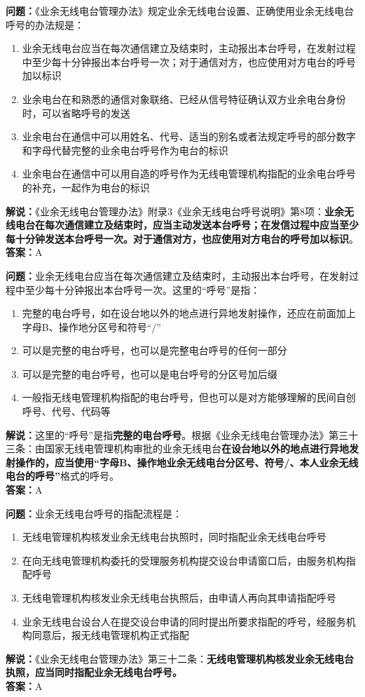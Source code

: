 \textbf{问题：}《业余无线电台管理办法》规定业余无线电台设置、正确使用业余无线电台呼号的办法规是：
\begin{enumerate}[label=\Alph*), leftmargin=1cm]
	\item 业余无线电台应当在每次通信建立及结束时，主动报出本台呼号，在发射过程中至少每十分钟报出本台呼号一次；对于通信对方，也应使用对方电台的呼号加以标识
	\item 业余电台在和熟悉的通信对象联络、已经从信号特征确认双方业余电台身份时，可以省略呼号的发送
	\item 业余电台在通信中可以用姓名、代号、适当的别名或者法规定呼号的部分数字和字母代替完整的业余电台呼号作为电台的标识
	\item 业余电台在通信中可以用自造的呼号作为无线电管理机构指配的业余电台呼号的补充，一起作为电台的标识
\end{enumerate}
\textbf{解说：}《业余无线电台管理办法》附录3《业余无线电台呼号说明》第8项：\textbf{业余无线电台在每次通信建立及结束时，应当主动发送本台呼号；在发信过程中应当至少每十分钟发送本台呼号一次。对于通信对方，也应使用对方电台的呼号加以标识}。\\\textbf{答案：}A

\textbf{问题：}业余无线电台应当在每次通信建立及结束时，主动报出本台呼号，在发射过程中至少每十分钟报出本台呼号一次。这里的“呼号”是指：
\begin{enumerate}[label=\Alph*), leftmargin=1cm]
	\item 完整的电台呼号，如在设台地以外的地点进行异地发射操作，还应在前面加上字母B、操作地分区号和符号“/”
	\item 可以是完整的电台呼号，也可以是完整电台呼号的任何一部分
	\item 可以是完整的电台呼号，也可以是电台呼号的分区号加后缀
	\item 一般指无线电管理机构指配的电台呼号，但也可以是对方能够理解的民间自创呼号、代号、代码等
\end{enumerate}
\textbf{解说：}这里的“呼号”是指\textbf{完整的电台呼号}。根据《业余无线电台管理办法》第三十三条：由国家无线电管理机构审批的业余无线电台\textbf{在设台地以外的地点进行异地发射操作的，应当使用“字母B、操作地业余无线电台分区号、符号/、本人业余无线电台的呼号”}格式的呼号。\\\textbf{答案：}A

\textbf{问题：}业余无线电台呼号的指配流程是：
\begin{enumerate}[label=\Alph*), leftmargin=1cm]
	\item 无线电管理机构核发业余无线电台执照时，同时指配业余无线电台呼号
	\item 在向无线电管理机构委托的受理服务机构提交设台申请窗口后，由服务机构指配呼号
	\item 无线电管理机构核发业余无线电台执照后，由申请人再向其申请指配呼号
	\item 业余无线电台设台人在提交设台申请的同时提出所要求指配的呼号，经服务机构同意后，报无线电管理机构正式指配
\end{enumerate}
\textbf{解说：}《业余无线电台管理办法》第三十二条：\textbf{无线电管理机构核发业余无线电台执照，应当同时指配业余无线电台呼号。}\\\textbf{答案：}A

